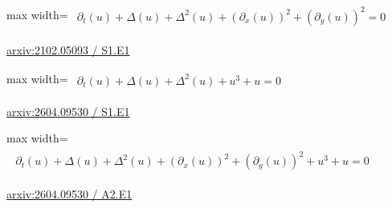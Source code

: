 \documentclass[10pt,a4paper]{article}
\begin{document}
\begin{minipage}{\linewidth}
\begin{center}\begin{adjustbox}{max width=\linewidth}$\displaystyle\begin{gathered}\begin{gathered}\partial_{t}(u)+\Delta(u)+\Delta^{2}(u)+(\partial_{x}(u))^{2}+(\partial_{y}(u))^{2}=0\end{gathered}\end{gathered}$\end{adjustbox}\end{center}
{\small \href{https://arxiv.org/html/2102.05093#S1.E1}{arxiv:2102.05093 / S1.E1}}\par
\end{minipage}\par\vspace{7mm}

\begin{minipage}{\linewidth}
\begin{center}\begin{adjustbox}{max width=\linewidth}$\displaystyle\begin{gathered}\begin{gathered}\partial_{t}(u)+\Delta(u)+\Delta^{2}(u)+u^{3}+u=0\end{gathered}\end{gathered}$\end{adjustbox}\end{center}
{\small \href{https://arxiv.org/html/2604.09530#S1.E1}{arxiv:2604.09530 / S1.E1}}\par
\end{minipage}\par\vspace{7mm}

\begin{minipage}{\linewidth}
\begin{center}\begin{adjustbox}{max width=\linewidth}$\displaystyle\begin{gathered}\begin{gathered}\partial_{t}(u)+\Delta(u)+\Delta^{2}(u)+(\partial_{x}(u))^{2}+(\partial_{y}(u))^{2}+u^{3}+u=0\end{gathered}\end{gathered}$\end{adjustbox}\end{center}
{\small \href{https://arxiv.org/html/2604.09530#A2.E1}{arxiv:2604.09530 / A2.E1}}\par
\end{minipage}\par\vspace{7mm}
\end{document}

